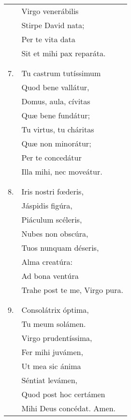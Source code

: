 \begin{longtable}{ll}
&Virgo venerábilis\\
&Stirpe David nata;\\
&Per te vita data\\
&Sit et mihi pax reparáta.\\
\\\\
7. &Tu castrum tutíssimum\\
&Quod bene vallátur,\\
&Domus, aula, cívitas\\
&Quæ bene fundátur;\\
&Tu virtus, tu cháritas\\
&Quæ non minorátur;\\
&Per te concedátur\\
&Illa mihi, nec moveátur.\\
\\\\
8. &Iris nostri fœderis,\\
&Jáspidis figúra,\\
&Piáculum scéleris,\\
&Nubes non obscúra,\\
&Tuos nunquam déseris,\\
&Alma creatúra:\\
&Ad bona ventúra\\
&Trahe post te me, Virgo pura.\\
\\\\
9. &Consolátrix óptima,\\
&Tu meum solámen.\\
&Virgo prudentíssima,\\
&Fer mihi juvámen,\\
&Ut mea sic ánima\\
&Séntiat levámen,\\
&Quod post hoc certámen\\
&Mihi Deus concédat. Amen.
\end{longtable}
